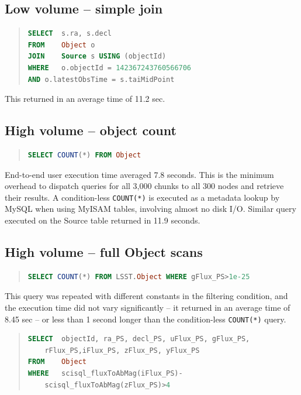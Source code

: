 \documentclass[DM,toc]{lsstdoc}
\begin{document}
\subsection{Low volume – simple join}

\begin{quote}
\begin{lstlisting}[language=SQL]
SELECT	s.ra, s.decl
FROM	Object o
JOIN	Source s USING (objectId)
WHERE	o.objectId = 142367243760566706
AND	o.latestObsTime = s.taiMidPoint
\end{lstlisting}
\end{quote}

This returned in an average time of 11.2 sec.

\subsection{High volume – object count}

\begin{quote}
\begin{lstlisting}[language=SQL]
SELECT COUNT(*) FROM Object
\end{lstlisting}
\end{quote}

End-to-end user execution time averaged 7.8 seconds. This is the minimum overhead to dispatch queries for all 3,000 chunks to all 300 nodes and retrieve their results. A condition-less \texttt{COUNT(*)} is executed as a metadata lookup by MySQL when using MyISAM tables, involving almost no disk I/O.
Similar query executed on the Source table returned in 11.9 seconds.

\subsection{High volume – full Object scans}

\begin{quote}
\begin{lstlisting}[language=SQL]
SELECT COUNT(*) FROM LSST.Object WHERE gFlux_PS>1e-25
\end{lstlisting}
\end{quote}

This query was repeated with different constants in the filtering condition, and the execution time did not vary significantly – it returned in an average time of 8.45 sec – or less than 1 second longer than the condition-less
\texttt{COUNT(*)} query.

\begin{quote}
\begin{lstlisting}[language=SQL]
SELECT	objectId, ra_PS, decl_PS, uFlux_PS, gFlux_PS,
	rFlux_PS,iFlux_PS, zFlux_PS, yFlux_PS
FROM	Object
WHERE	scisql_fluxToAbMag(iFlux_PS)-
	scisql_fluxToAbMag(zFlux_PS)>4
\end{lstlisting}
\end{quote}
\end{document}
